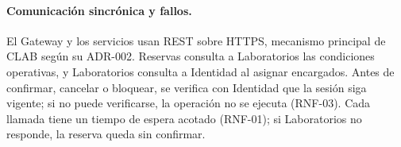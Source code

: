 \paragraph{Comunicación sincrónica y fallos.}
El Gateway y los servicios usan REST sobre HTTPS, mecanismo principal de CLAB
según su ADR-002. Reservas consulta a Laboratorios las condiciones operativas,
y Laboratorios consulta a Identidad al asignar encargados. Antes de confirmar,
cancelar o bloquear, se verifica con Identidad que la sesión siga vigente; si
no puede verificarse, la operación no se ejecuta (RNF-03). Cada llamada tiene
un tiempo de espera acotado (RNF-01); si Laboratorios no responde, la reserva
queda sin confirmar.